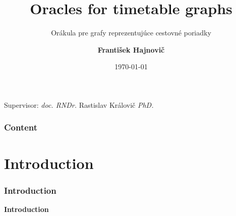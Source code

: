 \documentclass[]{beamer}
\title{\textbf{Oracles for timetable graphs}}
\subtitle{Orákula pre grafy reprezentujúce cestovné poriadky}
\author{\textbf{František Hajnovič}}
\institute{FMFI UK}
\date{\today}
\begin{document}
	{
    \begin{frame}
        \titlepage
        \begin{center}
            Supervisor: \textit{doc. RNDr.} Rastislav Královič \textit{PhD.}
        \end{center}
    \end{frame}
    }

    \begin{frame}
        \frametitle{Content}
        \tableofcontents
    \end{frame}

    \section{Introduction}
    \begin{frame}
        \frametitle{Introduction}
        \begin{center}
            \textcolor{red!80!black}{\textbf{Introduction}}
        \end{center}
    \end{frame}
\end{document}
